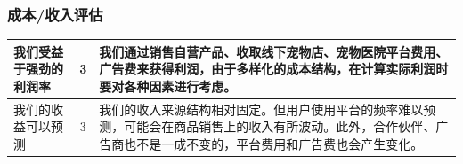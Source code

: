 \documentclass[a4paper]{ctexart}
\begin{document}
\subsubsection{成本/收入评估}
\begin{table}[h]
  \centering
\begin{tabular}{|p{3.5cm}|c|p{10cm}|}
  \hline
  我们受益于强劲的利润率 & 3 & 我们通过销售自营产品、收取线下宠物店、宠物医院平台费用、广告费来获得利润，由于多样化的成本结构，在计算实际利润时要对各种因素进行考虑。\\
  \hline
  我们的收益可以预测 & 3 & 我们的收入来源结构相对固定。但用户使用平台的频率难以预测，可能会在商品销售上的收入有所波动。此外，合作伙伴、广告商也不是一成不变的，平台费用和广告费也会产生变化。\\
  \hline
\end{tabular}
\end{table}
\end{document}
